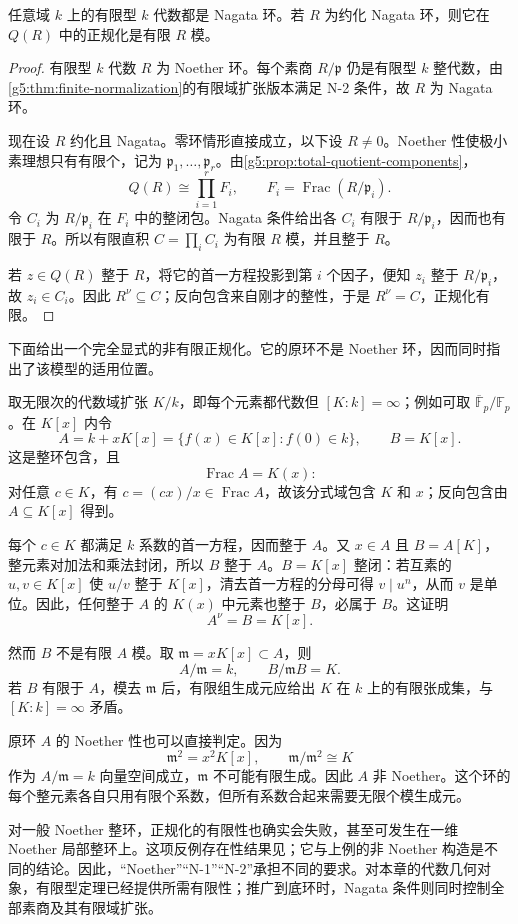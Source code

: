 \begin{proposition}
\label{g5:prop:nagata-normalization-finite}
	任意域 \(k\) 上的有限型 \(k\) 代数都是 Nagata 环。若 \(R\) 为约化 Nagata 环，则它在 \(Q(R)\) 中的正规化是有限 \(R\) 模。
\end{proposition}
\begin{proof}
	有限型 \(k\) 代数 \(R\) 为 Noether 环。每个素商 \(R/\mathfrak p\) 仍是有限型 \(k\) 整代数，由\cref{g5:thm:finite-normalization}的有限域扩张版本满足 N-2 条件，故 \(R\) 为 Nagata 环。

	现在设 \(R\) 约化且 Nagata。零环情形直接成立，以下设 \(R\ne0\)。Noether 性使极小素理想只有有限个，记为 \(\mathfrak p_1,\ldots,\mathfrak p_r\)。由\cref{g5:prop:total-quotient-components}，
	\[
		Q(R)\cong\prod_{i=1}^r F_i,\qquad
		F_i=\operatorname{Frac}(R/\mathfrak p_i).
	\]
	令 \(C_i\) 为 \(R/\mathfrak p_i\) 在 \(F_i\) 中的整闭包。Nagata 条件给出各 \(C_i\) 有限于 \(R/\mathfrak p_i\)，因而也有限于 \(R\)。所以有限直积
	\(C=\prod_i C_i\)
	为有限 \(R\) 模，并且整于 \(R\)。

	若 \(z\in Q(R)\) 整于 \(R\)，将它的首一方程投影到第 \(i\) 个因子，便知 \(z_i\) 整于 \(R/\mathfrak p_i\)，故 \(z_i\in C_i\)。因此 \(R^\nu\subseteq C\)；反向包含来自刚才的整性，于是 \(R^\nu=C\)，正规化有限。
\end{proof}

下面给出一个完全显式的非有限正规化。它的原环不是 Noether 环，因而同时指出了该模型的适用位置。

\begin{example}
\label{g5:exm:nonfinite-normalization}
	取无限次的代数域扩张 \(K/k\)，即每个元素都代数但 \([K:k]=\infty\)；例如可取 \(\overline{\mathbb F}_p/\mathbb F_p\)。在 \(K[x]\) 内令
	\[
		A=k+xK[x]
		=\{f(x)\in K[x]:f(0)\in k\},
		\qquad B=K[x].
	\]
	这是整环包含，且
	\[
		\operatorname{Frac}A=K(x):
	\]
	对任意 \(c\in K\)，有 \(c=(cx)/x\in\operatorname{Frac}A\)，故该分式域包含 \(K\) 和 \(x\)；反向包含由 \(A\subseteq K[x]\) 得到。

	每个 \(c\in K\) 都满足 \(k\) 系数的首一方程，因而整于 \(A\)。又 \(x\in A\) 且 \(B=A[K]\)，整元素对加法和乘法封闭，所以 \(B\) 整于 \(A\)。\(B=K[x]\) 整闭：若互素的 \(u,v\in K[x]\) 使 \(u/v\) 整于 \(K[x]\)，清去首一方程的分母可得 \(v\mid u^n\)，从而 \(v\) 是单位。因此，任何整于 \(A\) 的 \(K(x)\) 中元素也整于 \(B\)，必属于 \(B\)。这证明
	\[
		A^\nu=B=K[x].
	\]

	然而 \(B\) 不是有限 \(A\) 模。取 \(\mathfrak m=xK[x]\subset A\)，则
	\[
		A/\mathfrak m=k,\qquad
		B/\mathfrak mB=K.
	\]
	若 \(B\) 有限于 \(A\)，模去 \(\mathfrak m\) 后，有限组生成元应给出 \(K\) 在 \(k\) 上的有限张成集，与 \([K:k]=\infty\) 矛盾。

	原环 \(A\) 的 Noether 性也可以直接判定。因为
	\[
		\mathfrak m^2=x^2K[x],\qquad
		\mathfrak m/\mathfrak m^2\cong K
	\]
	作为 \(A/\mathfrak m=k\) 向量空间成立，\(\mathfrak m\) 不可能有限生成。因此 \(A\) 非 Noether。这个环的每个整元素各自只用有限个系数，但所有系数合起来需要无限个模生成元。
\end{example}

对一般 Noether 整环，正规化的有限性也确实会失败，甚至可发生在一维 Noether 局部整环上。这项反例存在性结果见\cite[第33节，第262、264页]{Matsumura1989}；它与上例的非 Noether 构造是不同的结论。因此，“Noether”“N-1”“N-2”承担不同的要求。对本章的代数几何对象，有限型定理已经提供所需有限性；推广到底环时，Nagata 条件则同时控制全部素商及其有限域扩张。

